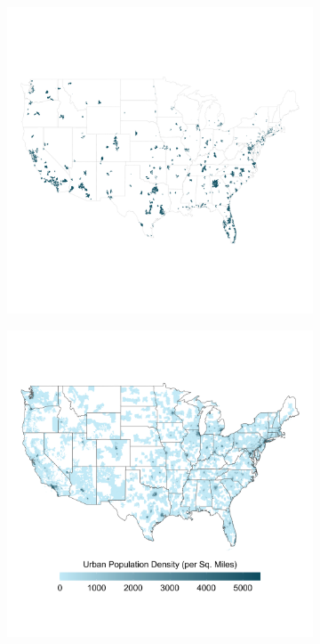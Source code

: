 \documentclass{article}
\begin{document}
\clearpage
\begin{figure}
	\centering
	\caption{Comparison Between Zillow Sample and Population Density in CBSAs}
	\begin{subfigure}[b]{\textwidth}
		\includegraphics[width = \textwidth]{../../analysis/descriptive/output/sample_map.png}
	\end{subfigure}
	\quad 
	\begin{subfigure}[b]{\textwidth}
		\includegraphics[width = \textwidth]{../../analysis/descriptive/output/popurban_density_map.png}
	\end{subfigure}
\end{figure}
\end{document}
